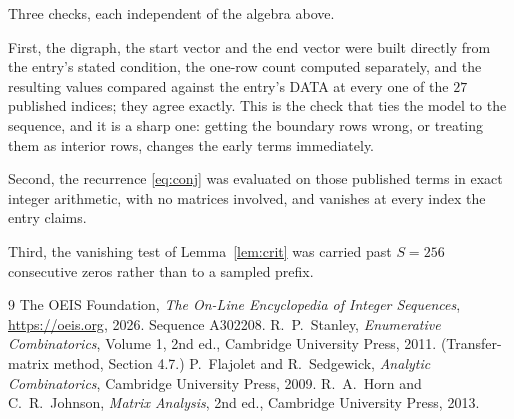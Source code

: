 \documentclass[11pt,a4paper]{article}
\theoremstyle{plain}
\theoremstyle{definition}
\begin{document}
Three checks, each independent of the algebra above.

First, the digraph, the start vector and the end vector were built directly from the
entry's stated condition, the one-row count computed separately, and the resulting values
compared against the entry's DATA at every one of the $27$ published indices; they
agree exactly. This is the check that ties the model to the sequence, and it is a sharp one:
getting the boundary rows wrong, or treating them as interior rows, changes the early terms
immediately.

Second, the recurrence \eqref{eq:conj} was evaluated on those published terms in exact
integer arithmetic, with no matrices involved, and vanishes at every index the entry claims.

Third, the vanishing test of Lemma~\ref{lem:crit} was carried past $S=256$ consecutive
zeros rather than to a sampled prefix.

\begin{thebibliography}{9}
 The OEIS Foundation, \emph{The On-Line Encyclopedia of Integer
Sequences}, \url{https://oeis.org}, 2026. Sequence A302208.
 R.~P.~Stanley, \emph{Enumerative Combinatorics}, Volume 1, 2nd ed.,
Cambridge University Press, 2011. (Transfer-matrix method, Section 4.7.)
 P.~Flajolet and R.~Sedgewick, \emph{Analytic Combinatorics}, Cambridge
University Press, 2009.
 R.~A.~Horn and C.~R.~Johnson, \emph{Matrix Analysis}, 2nd ed., Cambridge
University Press, 2013.
\end{thebibliography}
\end{document}
